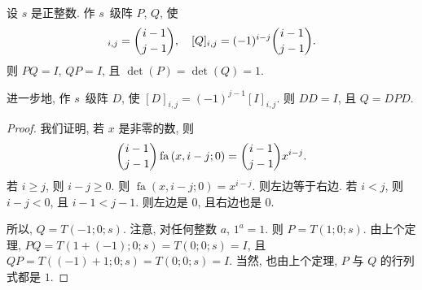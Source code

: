 \documentclass[../libro.tex]{subfiles}
\begin{document}
\begin{theorem}
    设 \(s\) 是正整数.
    作 \(s\)~级阵 \(P\), \(Q\), 使
    \begin{align*}
        [P]_{i,j} = \dbinom{i-1}{j-1},
        \quad
        [Q]_{i,j} = (-1)^{i-j} \dbinom{i-1}{j-1}.
    \end{align*}
    则 \(PQ = I\), \(QP = I\),
    且 \(\det {(P)} = \det {(Q)} = 1\).

    进一步地, 作 \(s\)~级阵 \(D\), 使
    \([D]_{i,j} = (-1)^{j-1} [I]_{i,j}\).
    则 \(D D = I\), 且 \(Q = D P D\).
\end{theorem}

\begin{proof}
    我们证明, 若 \(x\) 是非零的数, 则
    \begin{align*}
        \dbinom{i-1}{j-1} \operatorname{fa} {(x, i-j; 0)}
        = \dbinom{i-1}{j-1} x^{i-j}.
    \end{align*}
    若 \(i \geq j\), 则 \(i - j \geq 0\).
    则 \(\operatorname{fa} {(x, i-j; 0)} = x^{i-j}\).
    则左边等于右边.
    若 \(i < j\), 则 \(i - j < 0\), 且 \(i - 1 < j - 1\).
    则左边是 \(0\), 且右边也是 \(0\).

    所以, \(Q = T(-1; 0; s)\).
    注意, 对任何整数 \(a\), \(1^a = 1\).
    则 \(P = T(1; 0; s)\).
    由上个定理,
    \(P Q = T(1 + (-1); 0; s) = T(0; 0; s) = I\),
    且 \(Q P = T((-1) + 1; 0; s) = T(0; 0; s) = I\).
    当然, 也由上个定理, \(P\) 与 \(Q\) 的行列式都是 \(1\).


\end{proof}
\end{document}
